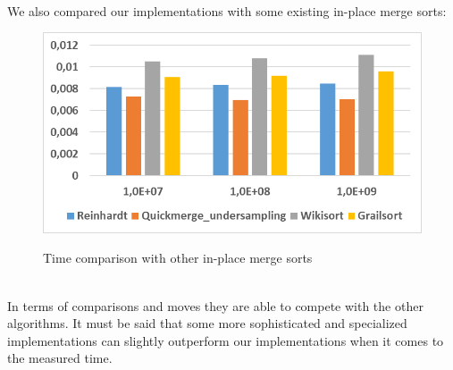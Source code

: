 \documentclass[11pt,pdftex,a4paper, twocolumn]{article}
\begin{document}
$ $ \\
We also compared our implementations with some existing in-place merge sorts: \\
\begin{figure}[H]
\includegraphics[width=\linewidth]{Diagramm-Bilder/time-other-inplace.JPG} \\
\caption{Time comparison with other in-place merge sorts} \label{fig:time-other-inplace}
\end{figure}
$ $ \\
In terms of comparisons and moves they are able to compete with the other algorithms. It must be said that some more sophisticated and specialized implementations can slightly outperform our implementations when it comes to the measured time.

\newpage
\nocite{wegener1993bottom}
\nocite{edelkamp2019worst}


\end{document}
